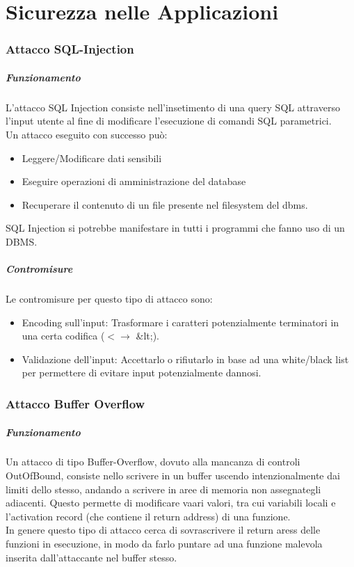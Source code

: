 \documentclass[12pt, a4paper, openany]{book}
\begin{document}
\chapter{Sicurezza nelle Applicazioni}
\subsection{Attacco SQL-Injection}
\paragraph*{Funzionamento}
L'attacco SQL Injection consiste nell'insetimento di una query SQL attraverso l'input utente al fine di modificare l'esecuzione di comandi SQL parametrici.
\\Un attacco eseguito con successo può:
\begin{itemize}
    \item Leggere/Modificare dati sensibili
    \item Eseguire operazioni di amministrazione del database
    \item Recuperare il contenuto di un file presente nel filesystem del dbms.
\end{itemize}
SQL Injection si potrebbe manifestare in tutti i programmi che fanno uso di un DBMS.
\paragraph*{Contromisure} Le contromisure per questo tipo di attacco sono:
\begin{itemize}
    \item Encoding sull'input: Trasformare i caratteri potenzialmente terminatori in una certa codifica ($< \to $ \&lt;).
    \item Validazione dell'input: Accettarlo o rifiutarlo in base ad una white/black list per permettere di evitare input potenzialmente dannosi.
\end{itemize}

\subsection{Attacco Buffer Overflow}
\paragraph*{Funzionamento}
Un attacco di tipo Buffer-Overflow, dovuto alla mancanza di controli OutOfBound, consiste nello scrivere in un buffer uscendo intenzionalmente dai limiti dello stesso, andando a scrivere in aree di memoria non assegnategli adiacenti.
Questo permette di modificare vaari valori, tra cui variabili locali e l'activation record (che contiene il return address) di una funzione.
\\In genere questo tipo di attacco cerca di sovrascrivere il return aress delle funzioni in esecuzione, in modo da farlo puntare ad una funzione malevola inserita dall'attaccante nel buffer stesso.
\end{document}
